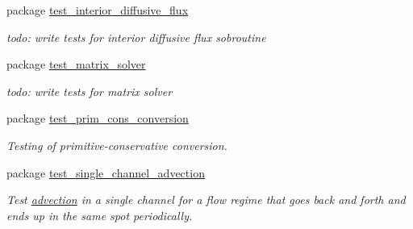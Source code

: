 \begin{CompactItemize}
\item 
package \hyperlink{a00092}{test\_\-interior\_\-diffusive\_\-flux}
\begin{CompactList}\small\item\em todo: write tests for interior diffusive flux sobroutine \item\end{CompactList}

\item 
package \hyperlink{a00093}{test\_\-matrix\_\-solver}
\begin{CompactList}\small\item\em todo: write tests for matrix solver \item\end{CompactList}

\item 
package \hyperlink{a00094}{test\_\-prim\_\-cons\_\-conversion}
\begin{CompactList}\small\item\em Testing of primitive-conservative conversion. \item\end{CompactList}

\item 
package \hyperlink{a00095}{test\_\-single\_\-channel\_\-advection}
\begin{CompactList}\small\item\em Test \hyperlink{a00054}{advection} in a single channel for a flow regime that goes back and forth and ends up in the same spot periodically. \item\end{CompactList}

\end{CompactItemize}
